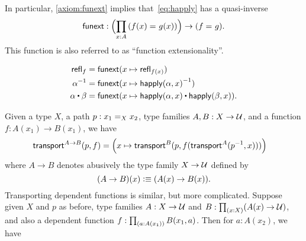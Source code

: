 \documentclass[hott-all.tex]{subfiles}
\begin{document}
%
In particular, \cref{axiom:funext} implies that~\eqref{eq:happly} has a quasi-inverse
\[
\funext : \Parens{\prd{x:A} (\id{f(x)}{g(x)})} \to {(\id{f}{g})}.
\]
This function is also referred to as ``function extensionality''.

\begin{align*}
\refl{f} &= \funext(x \mapsto \refl{f(x)}) \\
\opp{\alpha} &= \funext (x \mapsto \opp{\happly (\alpha,x)})  \\
{\alpha} \ct \beta &= \funext (x \mapsto {\happly({\alpha},x) \ct \happly({\beta},x)}).
\end{align*}

Given a type $X$, a path $p:\id[X]{x_1}{x_2}$, type families $A,B:X\to \type$, and a function $f : A(x_1) \to B(x_1)$,  we have
\begin{align}\label{eq:transport-arrow}
  \transfib{A\to B}{p}{f} &=
  \Big(x \mapsto \transfib{B}{p}{f(\transfib{A}{\opp p}{x})}\Big)
\end{align}
where $A\to B$ denotes abusively the type family $X\to \type$ defined by
\[(A\to B)(x) \defeq (A(x)\to B(x)).\]
%
Transporting dependent functions is similar, but more complicated.
Suppose given $X$ and $p$ as before, type families $A:X\to \type$ and $B:\prd{x:X} (A(x)\to\type)$, and also a dependent function $f : \prd{a:A(x_1)} B(x_1,a)$.
Then for $a:A(x_2)$, we have
\end{document}
